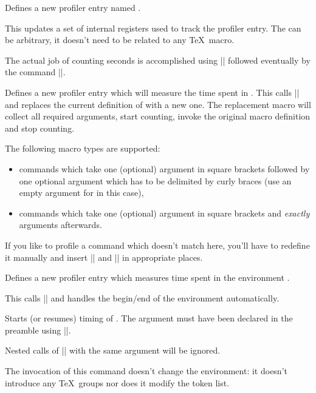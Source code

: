 \begin{command}{\pgfprofilenew{}}
	Defines a new profiler entry named .

	This updates a set of internal registers used to track the profiler entry. The  can be arbitrary, it doesn't need to be related to any \TeX\ macro.

	The actual job of counting seconds is accomplished using |\pgfprofilestart| followed eventually by the command |\pgfprofileend|.
\end{command}

\begin{command}{\pgfprofilenewforcommand{}}
	Defines a new profiler entry which will measure the time spent in . This calls |\pgfprofilenew| and replaces the current definition of  with a new one. The replacement macro will collect all required arguments, start counting, invoke the original macro definition and stop counting.

	The following macro types are supported:
	\begin{itemize}
 \item commands which take one (optional) argument in square brackets
   followed by one optional argument which has to be delimited by
   curly braces (use an empty argument for  in this case),
 \item commands which take one (optional) argument in square brackets
   and \emph{exactly}  arguments afterwards.
	\end{itemize}

	If you like to profile a command which doesn't match here, you'll have to redefine it manually and insert |\pgfprofilestart| and |\pgfprofileend| in appropriate places.
\end{command}

\begin{command}{\pgfprofilenewforenvironment{}}
	Defines a new profiler entry which measures time spent in the environment .

	This calls |\pgfprofilenew| and handles the begin/end of the environment automatically.
\end{command}


\begin{command}{\pgfprofilestart{}}
	Starts (or resumes) timing of . The argument must have been declared in the preamble using |\pgfprofilenew|.

	Nested calls of |\pgfprofilestart| with the same argument will be ignored.

	The invocation of this command doesn't change the environment: it doesn't introduce any \TeX\ groups nor does it modify the token list.
\end{command}

